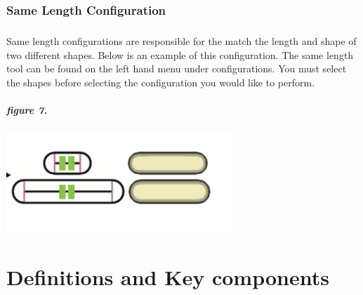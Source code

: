 \documentclass{report}
\begin{document}
\subsection*{Same Length Configuration}

\paragraph{} Same length configurations are responsible for the match the length and shape of two different shapes. Below is an example of this configuration. The same length tool can be found on the left hand menu under configurations. You must select the shapes before selecting the configuration you would like to perform.

\paragraph{figure 7.}
\begin{center}
\includegraphics[width=\textwidth/2]{same_length2.png}
\end{center}

\chapter{Definitions and Key components}
\end{document}
